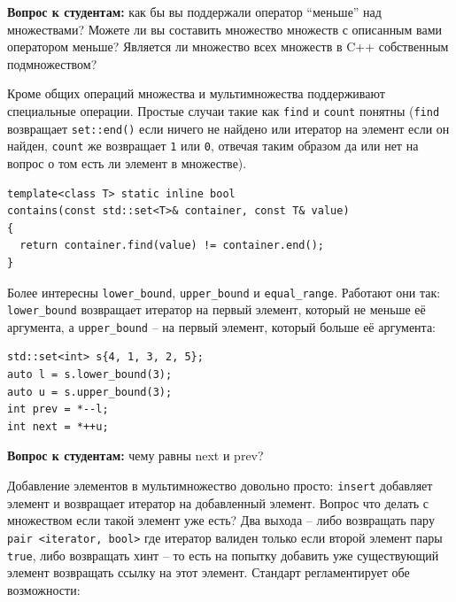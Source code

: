 \documentclass[a4paper,12pt,oneside]{article}
\newif\ifanswers
\begin{document}
\textbf{Вопрос к студентам:} как бы вы поддержали оператор ``меньше'' над множествами? Можете ли вы составить множество множеств с описанным вами оператором меньше? Является ли множество всех множеств в C++ собственным подмножеством?

\ifanswers
Много вариантов на самом деле. Простейший -- сравнивать размер, если размер второго аргумента больше размера первого возвращать true, иначе false.

Такой экзотики как множество всех множеств в C++ не бывает благодаря тому что каждый уровень инстанцирования шаблона задает по сути фон-Неймановский класс.
\fi

Кроме общих операций множества и мультимножества поддерживают специальные операции. Простые случаи такие как \lstinline!find! и \lstinline!count! понятны (\lstinline!find! возвращает \lstinline!set::end()! если ничего не найдено или итератор на элемент если он найден, \lstinline!count! же возвращает \lstinline!1! или \lstinline!0!, отвечая таким образом да или нет на вопрос о том есть ли элемент в множестве).

\begin{lstlisting}
template<class T> static inline bool 
contains(const std::set<T>& container, const T& value)
{
  return container.find(value) != container.end();
}
\end{lstlisting}

Более интересны \lstinline!lower_bound!, \lstinline!upper_bound! и \lstinline!equal_range!. Работают они так: \lstinline!lower_bound! возвращает итератор на первый элемент, который не меньше её аргумента, а \lstinline!upper_bound! -- на первый элемент, который больше её аргумента:

\begin{lstlisting}
std::set<int> s{4, 1, 3, 2, 5};
auto l = s.lower_bound(3);
auto u = s.upper_bound(3);
int prev = *--l;
int next = *++u;
\end{lstlisting}

\textbf{Вопрос к студентам:} чему равны next и prev?

\ifanswers
Верный ответ: конечно же 2 и 5 соответственно (2 потому что lower bound указывает на элемент 3, а 5 потому что upper bound указывает на 4).
\fi

Добавление элементов в мультимножество довольно просто: \lstinline!insert! добавляет элемент и возвращает итератор на добавленный элемент. Вопрос что делать с множеством если такой элемент уже есть? Два выхода -- либо возвращать пару \lstinline!pair <iterator, bool>! где итератор валиден только если второй элемент пары \lstinline!true!, либо возвращать хинт -- то есть на попытку добавить уже существующий элемент возвращать ссылку на этот элемент. Стандарт регламентирует обе возможности:
\end{document}
